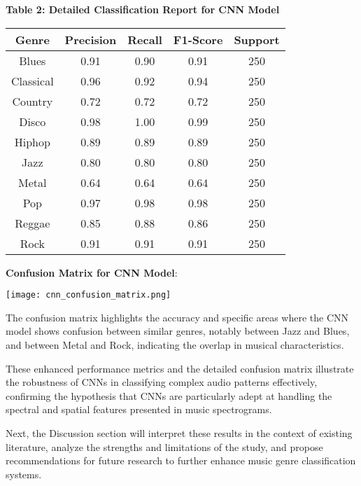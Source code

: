 \documentclass[lettersize,journal]{IEEEtran}
\begin{document}
\textbf{Table 2: Detailed Classification Report for CNN Model}
\begin{center}
\begin{tabular}{|c|c|c|c|c|}
\hline
Genre & Precision & Recall & F1-Score & Support \\
\hline
Blues & 0.91 & 0.90 & 0.91 & 250 \\
Classical & 0.96 & 0.92 & 0.94 & 250 \\
Country & 0.72 & 0.72 & 0.72 & 250 \\
Disco & 0.98 & 1.00 & 0.99 & 250 \\
Hiphop & 0.89 & 0.89 & 0.89 & 250 \\
Jazz & 0.80 & 0.80 & 0.80 & 250 \\
Metal & 0.64 & 0.64 & 0.64 & 250 \\
Pop & 0.97 & 0.98 & 0.98 & 250 \\
Reggae & 0.85 & 0.88 & 0.86 & 250 \\
Rock & 0.91 & 0.91 & 0.91 & 250 \\
\hline
\end{tabular}
\end{center}

\textbf{Confusion Matrix for CNN Model}:
\begin{center}
\texttt{[image: cnn\_confusion\_matrix.png]}
\end{center}

The confusion matrix highlights the accuracy and specific areas where the CNN model shows confusion between similar genres, notably between Jazz and Blues, and between Metal and Rock, indicating the overlap in musical characteristics.

These enhanced performance metrics and the detailed confusion matrix illustrate the robustness of CNNs in classifying complex audio patterns effectively, confirming the hypothesis that CNNs are particularly adept at handling the spectral and spatial features presented in music spectrograms.

Next, the Discussion section will interpret these results in the context of existing literature, analyze the strengths and limitations of the study, and propose recommendations for future research to further enhance music genre classification systems.
\end{document}

